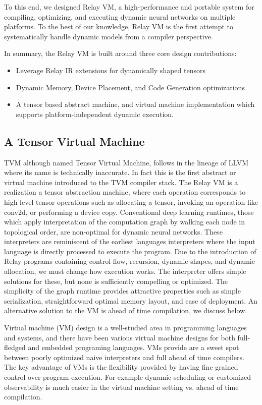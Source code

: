 To this end, we designed Relay VM, a high-performance and portable system for compiling, optimizing,
  and executing dynamic neural networks on multiple platforms.
To the best of our knowledge, Relay VM is the first attempt to
  systematically handle dynamic models from a compiler perspective.

In summary, the Relay VM is built around three core design contributions:
\begin{itemize}
  \item Leverage Relay IR extensions for dynamically shaped tensors
  \item Dynamic Memory, Device Placement, and Code Generation optimizations
  \item A tensor based abstract machine, and virtual machine implementation which
        supports platform-independent dynamic execution.
\end{itemize}

\subsection{A Tensor Virtual Machine}

TVM although named Tensor Virtual Machine, follows in the lineage of LLVM
  where its name is technically inaccurate.
In fact this is the first abstract or virtual machine introduced to the
  TVM compiler stack.
The Relay VM is a realization a tensor abstraction machine,
  where each operation corresponds to high-level tensor operations such
  as allocating a tensor, invoking an operation like conv2d, or performing a device copy.
Conventional deep learning runtimes, those which apply interpretation of the
  computation graph by walking each node in topological order, are non-optimal
  for dynamic neural networks.
These interpreters are reminiscent of the earliest
  languages interpreters where the input language is directly
  processed to execute the program.
Due to the introduction of Relay programs containing
  control flow, recursion, dynamic shapes, and dynamic allocation,
  we must change how execution works.
The interpreter offers simple solutions for these,
  but none is sufficiently compelling or optimized.
The simplicity of the graph runtime provides attractive
  properties such as simple serialization, straightforward
  optimal memory layout, and ease of deployment.
An alternative solution to the VM is ahead of time
  compilation, we discuss below.

Virtual machine (VM) design is a
  well-studied area in programming languages and systems,
  and there have been various virtual machine designs
  for both full-fledged and embedded programing languages.
VMs provide are a sweet spot between
  poorly optimized naive interpreters
  and full ahead of time compilers.
The key advantage of VMs is the flexibility provided
  by having fine grained control over program execution.
For example dynamic scheduling or customized observability
  is much easier in the virtual machine setting vs. ahead of time compilation.


